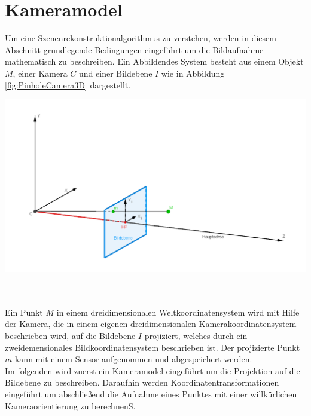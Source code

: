 \chapter{Kameramodel}
\label{sec:CameraModels}

Um eine Szenenrekonstruktionalgorithmus zu verstehen, werden in diesem Abschnitt grundlegende  Bedingungen eingeführt um die Bildaufnahme mathematisch zu beschreiben. Ein Abbildendes System besteht aus einem Objekt $M$, einer Kamera $C$ und einer Bildebene $I$ wie in Abbildung \ref{fig:PinholeCamera3D} dargestellt.\\

\begin{minipage}{\linewidth}
	\centering
	\includegraphics[width=.8\linewidth]{images/PinholeCameraModell3D.png}
	\label{fig:PinholeCamera3D}
\end{minipage}\\\\

Ein Punkt $M$ in einem dreidimensionalen Weltkoordinatensystem wird mit Hilfe der Kamera, die in einem eigenen dreidimensionalen Kamerakoordinatensystem beschrieben wird, auf die Bildebene $I$ projiziert, welches durch ein zweidemensionales Bildkoordinatensystem beschrieben ist. Der projizierte Punkt $m$ kann mit einem Sensor aufgenommen und abgespeichert werden.  \\ 

Im folgenden wird zuerst ein Kameramodel eingeführt um die Projektion auf die Bildebene zu beschreiben. Daraufhin werden Koordinatentransformationen eingeführt um abschließend die Aufnahme eines Punktes mit einer willkürlichen Kameraorientierung zu berechnenS. 



